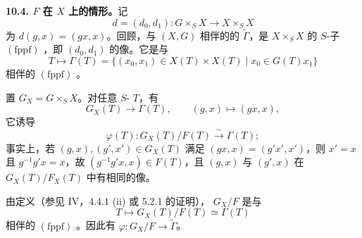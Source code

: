 \textbf{10.4. $F$ 在 $X$ 上的情形。}记
\[
d=(d_0,d_1):G\times_SX\longrightarrow X\times_SX
\]
为 $d(g,x)=(gx,x)$。回顾，与 $(X,G)$ 相伴的的 $\widetilde\Gamma$，是 $X\times_SX$ 的 $S$-子 $(\mathrm{fppf})$ ，即 $(d_0,d_1)$ 的像。它是与
\[
T\longmapsto\Gamma(T)=\{(x_0,x_1)\in X(T)\times X(T)\mid x_0\in G(T)x_1\}
\]
相伴的 $(\mathrm{fppf})$ 。

置 $G_X=G\times_SX$。对任意 $S$- $T$，有
\[
G_X(T)\longrightarrow\Gamma(T),\qquad(g,x)\longmapsto(gx,x),
\]
它诱导
\[
\varphi(T):G_X(T)/F(T)\xrightarrow\sim\Gamma(T);
\]
事实上，若 $(g,x),(g',x')\in G_X(T)$ 满足 $(gx,x)=(g'x',x')$，则 $x'=x$ 且 $g^{-1}g'x=x$，故 $(g^{-1}g'x,x)\in F(T)$，且 $(g,x)$ 与 $(g',x)$ 在 $G_X(T)/F_X(T)$ 中有相同的像。

由定义（参见 IV，4.4.1 (ii) 或 5.2.1 的证明）， $G_X/F$ 是与
\[
T\longmapsto G_X(T)/F(T)\simeq\Gamma(T)
\]
相伴的 $(\mathrm{fppf})$ 。因此有 $\varphi:G_X/F\to\widetilde\Gamma$。

